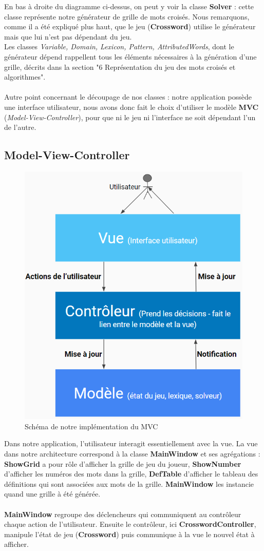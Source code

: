 \documentclass [ 11 pt ] {article}
\begin{document}
    En bas à droite du diagramme ci-dessus, on peut y voir la classe \textbf{Solver} : cette classe représente notre générateur de grille de mots croisés. Nous remarquons, comme il a été expliqué plus haut, que le jeu (\textbf{Crossword}) utilise le générateur mais que lui n’est pas dépendant du jeu.\\
    Les classes \textit{Variable, Domain, Lexicon, Pattern, AttributedWords}, dont le générateur dépend rappellent tous les éléments nécessaires à la génération d’une grille, décrits dans la section "6 Représentation du jeu des mots croisés et algorithmes".
    \\\\
    Autre point concernant le découpage de nos classes : notre application possède une interface utilisateur, nous avons donc fait le choix d’utiliser le modèle \textbf{MVC} (\textit{Model-View-Controller}), pour que ni le jeu ni l’interface ne soit dépendant l’un de l’autre.
    
\subsection{Model-View-Controller}
    \begin{figure}[H] 
    \center 
    \includegraphics[width=0.4\linewidth]{mvc.png}
    \caption{Schéma de notre implémentation du MVC}
    \end{figure}
    Dans notre application, l’utilisateur interagit essentiellement avec la vue. La vue dans notre architecture correspond à la classe \textbf{MainWindow} et ses agrégations : \textbf{ShowGrid} a pour rôle d’afficher la grille de jeu du joueur, \textbf{ShowNumber} d’afficher les numéros des mots dans la grille, \textbf{DefTable} d’afficher le tableau des définitions qui sont associées aux mots de la grille. \textbf{MainWindow} les instancie quand une grille à été générée.
    \\\\
    \textbf{MainWindow} regroupe des déclencheurs qui communiquent au contrôleur chaque action de l’utilisateur. Ensuite le contrôleur, ici \textbf{CrosswordController}, manipule l’état de jeu (\textbf{Crossword}) puis communique à la vue le nouvel état à afficher.
    
\end{document}
